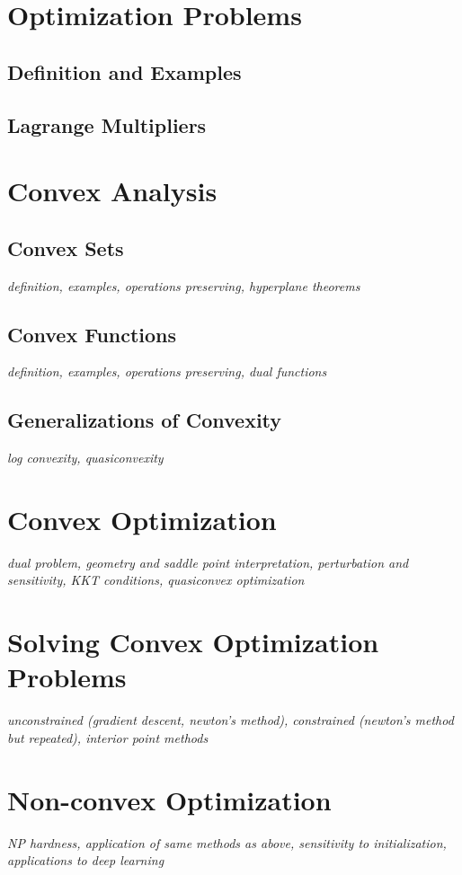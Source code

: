 \documentclass[../../../main.tex]{subfiles}
\begin{document}

\section{Optimization Problems}
\subsection{Definition and Examples}
\subsection{Lagrange Multipliers}

\section{Convex Analysis}
\subsection{Convex Sets}
\textit{definition, examples, operations preserving, hyperplane theorems}
\subsection{Convex Functions}
\textit{definition, examples, operations preserving, dual functions}
\subsection{Generalizations of Convexity}
\textit{log convexity, quasiconvexity}
\section{Convex Optimization}
\textit{dual problem, geometry and saddle point interpretation, perturbation and sensitivity, KKT conditions, quasiconvex optimization}
\section{Solving Convex Optimization Problems}
\textit{unconstrained (gradient descent, newton's method), constrained (newton's method but repeated), interior point methods}
\section{Non-convex Optimization}
\textit{NP hardness, application of same methods as above, sensitivity to initialization, applications to deep learning}

\printbibliography[
    heading=subbibintoc,
    title={References}
]
\end{document}
